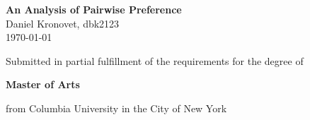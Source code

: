 \begin{center}
  \Large \textbf{An Analysis of Pairwise Preference} \\
  \vspace{0.1in}
  \normalsize Daniel Kronovet, dbk2123\\
  \today
\end{center}

\bigskip

\begin{center}  
Submitted in partial fulfillment of the requirements for the degree of

\textbf{Master of Arts}

from Columbia University in the City of New York
\end{center}